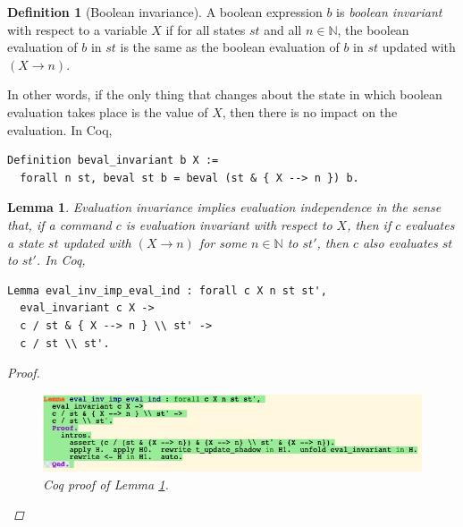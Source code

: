 \documentclass[12pt,notitlepage]{report}
\theoremstyle{plain}
\newtheorem{lem}[theo]{Lemma}
\theoremstyle{definition}
\newtheorem{defin}[theo]{Definition}
\newcommand\N{\mathbb{N}}
\numberwithin{equation}{section}
\begin{document}
\begin{defin}[Boolean invariance]
A boolean expression $b$ is \emph{boolean invariant} with respect to a variable $X$ if for all states $st$ and all $n \in \N$, the boolean evaluation of $b$ in $st$ is the same as the boolean evaluation of $b$ in $st$ updated with $(X\longrightarrow n)$.
\par In other words, if the only thing that changes about the state in which boolean evaluation takes place is the value of $X$, then there is no impact on the evaluation.  In Coq,
\begin{verbatim}
Definition beval_invariant b X :=
  forall n st, beval st b = beval (st & { X --> n }) b. 
\end{verbatim}
\end{defin}

\begin{lem}\label{independence}
Evaluation invariance implies evaluation independence in the sense that, if a command $c$ is evaluation invariant with respect to $X$, then if $c$ evaluates a state $st$ updated with $(X\longrightarrow n)$ for some $n \in \N$ to $st'$, then $c$ also evaluates $st$ to $st'$.  In Coq,
\begin{verbatim}
Lemma eval_inv_imp_eval_ind : forall c X n st st', 
  eval_invariant c X ->
  c / st & { X --> n } \\ st' -> 
  c / st \\ st'.
\end{verbatim}
\begin{proof}\noindent
    \begin{figure}[H]
        \centering
        \includegraphics[scale=0.6]{lemma_final_3}
        \caption{Coq proof of Lemma \ref{independence}.}
        \label{fig:independence}
        \end{figure}
\end{proof}
\end{lem}
\end{document}
